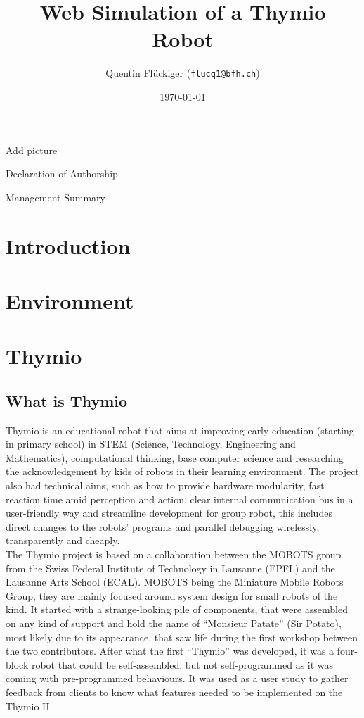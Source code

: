 \documentclass{scrartcl}
\begin{document}
Add picture
\title{Web Simulation of a Thymio Robot}
\date{\today}   %
\author{Quentin Flückiger (\texttt{flucq1@bfh.ch})}





\maketitle
\clearpage

Declaration of Authorship
\clearpage
\clearpage

Management Summary
\clearpage
\clearpage

\tableofcontents
\clearpage

\section{Introduction}

\section{Environment}

\section{Thymio}
\subsection{What is Thymio} 

Thymio is an educational robot that aims at improving early education (starting in primary school) in STEM (Science, Technology, Engineering and Mathematics),
computational thinking, base computer science and researching the acknowledgement by kids of robots in their learning environment.
The project also had technical aims, such as how to provide hardware modularity, fast reaction time amid perception and action,
clear internal communication bus in a user-friendly way and streamline development for group robot, this includes direct changes to the robots’ programs and parallel debugging wirelessly, 
transparently and cheaply.\\

The Thymio project is based on a collaboration between the MOBOTS group from the Swiss Federal Institute of Technology in Lausanne (EPFL) and the Lausanne Arts School (ECAL).
MOBOTS being the Miniature Mobile Robots Group, they are mainly focused around system design for small robots of the kind. It started with a strange-looking pile of components, 
that were assembled on any kind of support and hold the name of “Monsieur Patate” (Sir Potato), most likely due to its appearance, 
that saw life during the first workshop between the two contributors. After what the first “Thymio” was developed, 
it was a four-block robot that could be self-assembled, but not self-programmed as it was coming with pre-programmed behaviours. 
It was used as a user study to gather feedback from clients to know what features needed to be implemented on the Thymio II.\\
\end{document}
